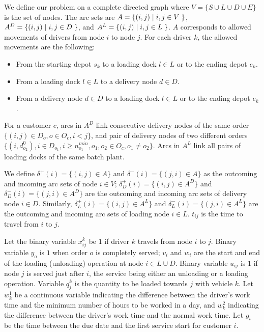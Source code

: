 \documentclass{article}
\begin{document}
We define our problem on a complete directed graph where $V=\{ S \cup L \cup D \cup E\}$ is the set of nodes. The arc sets are $A =  \{(i,j) \hspace*{1mm} \vert \hspace*{1mm} i, j \in V \hspace{1mm}\}$, $A^D = \{(i,j) \hspace*{1mm} \vert \hspace*{1mm} i, j \in D \hspace{1mm} \}$, and $A^L = \{(i,j) \hspace*{1mm} \vert \hspace*{1mm} i, j \in L \hspace{1mm} \}$. $A$ corresponds to allowed movements of drivers from node $i$ to node $j$. For each driver $k$, the allowed movements are the following:
\begin{itemize}
    \item From the starting depot $s_k$ to a loading dock $l \in L$ or to the ending depot $e_k$.
    \item From a loading dock $l \in L$ to a delivery node $d \in D$.
    \item From a delivery node  $d \in D$ to a loading dock $l \in L$ or to the ending depot $e_k$.
\end{itemize}
For a customer $c$, arcs in $A^D$ link consecutive delivery nodes of the same order   $\lbrace (i,j)\in D_o, o \in O_c, i < j  \rbrace$, and pair of delivery nodes of two different orders $ \lbrace (i,d^{0}_{o_2}),  i \in D_{o_1}, i \geq n^{min}_{o_1}, o_1, o_2 \in O_c, o_1 \neq o_2 \rbrace $. Arcs in $A^L$ link all pairs of loading docks of the same batch plant.

We define $\delta^{+}(i) = \{(i, j) \in A \}$ and $\delta^{-}(i) = \{(j, i) \in A \}$ as the outcoming and incoming arc sets of node $i \in V$; $\delta^{+}_D(i) = \{(i, j)  \in A^D\}$ and $\delta^{-}_D(i) = \{(j, i) \in A^D \}$ are the outcoming and incoming arc sets of delivery node $i \in D$.  Similarly, $\delta^{+}_L(i) = \{(i, j)  \in A^L\}$ and $\delta^{-}_L(i) = \{(j, i) \in A^L \}$ are the outcoming and incoming arc sets of loading node $i \in L$. $t_{ij}$ is the time to travel from $i$ to $j$.

Let the binary variable $x^{k}_{ij}$ be $1$ if driver $k$ travels from node $i$ to $j$. Binary variable $y_o$ is $1$ when order $o$ is completely served; $v_i$ and $w_i$ are the start and end of the loading (unloading) operation at node $i \in L\cup D$. Binary variable $u_{ij}$ is $1$ if node $j$ is served just after $i$, the service being either an unloading or a loading operation. Variable $q^k_j$ is the quantity to be loaded towards $j$ with vehicle $k$. Let $w^1_k$ be a continuous variable indicating the difference between the driver's work time and the minimum number of hours to be worked in a day, and $w^2_k$ indicating the difference between the driver's work time and the normal work time. Let $g_i$ be the time between the due date and the first service start for customer $i$.
\end{document}
